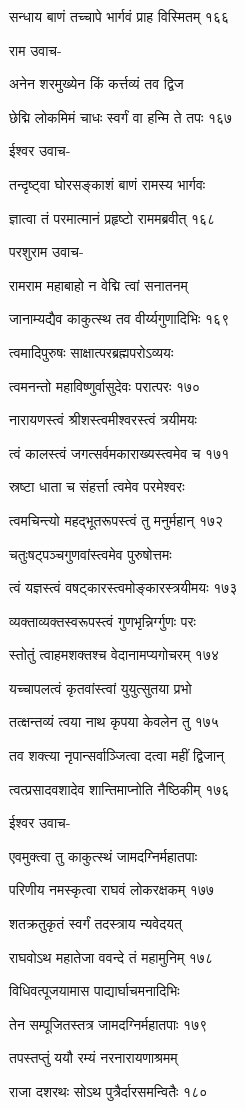 सन्धाय बाणं तच्चापे भार्गवं प्राह विस्मितम् १६६

राम उवाच-

अनेन शरमुख्येन किं कर्त्तव्यं तव द्विज

छेद्मि लोकमिमं चाधः स्वर्गं वा हन्मि ते तपः १६७

ईश्वर उवाच-

तन्दृष्ट्वा घोरसङ्काशं बाणं रामस्य भार्गवः

ज्ञात्वा तं परमात्मानं प्रहृष्टो राममब्रवीत् १६८

परशुराम उवाच-

रामराम महाबाहो न वेद्मि त्वां सनातनम्

जानाम्यद्यैव काकुत्स्थ तव वीर्य्यगुणादिभिः १६९

त्वमादिपुरुषः साक्षात्परब्रह्मपरोऽव्ययः

त्वमनन्तो महाविष्णुर्वासुदेवः परात्परः १७०

नारायणस्त्वं श्रीशस्त्वमीश्वरस्त्वं त्रयीमयः

त्वं कालस्त्वं जगत्सर्वमकाराख्यस्त्वमेव च १७१

स्रष्टा धाता च संहर्त्ता त्वमेव परमेश्वरः

त्वमचिन्त्यो महद्भूतरूपस्त्वं तु मनुर्महान् १७२

चतुःषट्पञ्चगुणवांस्त्वमेव पुरुषोत्तमः

त्वं यज्ञस्त्वं वषट्कारस्त्वमोङ्कारस्त्रयीमयः १७३

व्यक्ताव्यक्तस्वरूपस्त्वं गुणभृन्निर्ग्गुणः परः

स्तोतुं त्वाहमशक्तश्च वेदानामप्यगोचरम् १७४

यच्चापलत्वं कृतवांस्त्वां युयुत्सुतया प्रभो

तत्क्षन्तव्यं त्वया नाथ कृपया केवलेन तु १७५

तव शक्त्या नृपान्सर्वाञ्जित्वा दत्वा महीं द्विजान्

त्वत्प्रसादवशादेव शान्तिमाप्नोति नैष्ठिकीम् १७६

ईश्वर उवाच-

एवमुक्त्वा तु काकुत्स्थं जामदग्निर्महातपाः

परिणीय नमस्कृत्वा राघवं लोकरक्षकम् १७७

शतक्रतुकृतं स्वर्गं तदस्त्राय न्यवेदयत्

राघवोऽथ महातेजा ववन्दे तं महामुनिम् १७८

विधिवत्पूजयामास पाद्यार्घाचमनादिभिः

तेन सम्पूजितस्तत्र जामदग्निर्महातपाः १७९

तपस्तप्तुं ययौ रम्यं नरनारायणाश्रमम्

राजा दशरथः सोऽथ पुत्रैर्दारसमन्वितैः १८०

